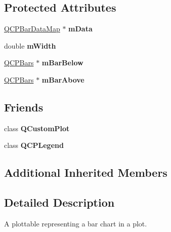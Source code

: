 \subsection*{Protected Attributes}
\begin{DoxyCompactItemize}
\item 
\hypertarget{classQCPBars_aef28d29d51ef84b608ecd22c55d531ff}{\hyperlink{qcustomplot_8h_aa846c77472cae93def9f1609d0c57191}{Q\-C\-P\-Bar\-Data\-Map} $\ast$ {\bfseries m\-Data}}\label{classQCPBars_aef28d29d51ef84b608ecd22c55d531ff}

\item 
\hypertarget{classQCPBars_a7c4e0f2246f8133f48a9c3f24cf5b920}{double {\bfseries m\-Width}}\label{classQCPBars_a7c4e0f2246f8133f48a9c3f24cf5b920}

\item 
\hypertarget{classQCPBars_a02eb7de7a2c03dc5699f329bb1c5f6e1}{\hyperlink{classQCPBars}{Q\-C\-P\-Bars} $\ast$ {\bfseries m\-Bar\-Below}}\label{classQCPBars_a02eb7de7a2c03dc5699f329bb1c5f6e1}

\item 
\hypertarget{classQCPBars_ade19776a2a6d393f15c0e27d4bb8e594}{\hyperlink{classQCPBars}{Q\-C\-P\-Bars} $\ast$ {\bfseries m\-Bar\-Above}}\label{classQCPBars_ade19776a2a6d393f15c0e27d4bb8e594}

\end{DoxyCompactItemize}
\subsection*{Friends}
\begin{DoxyCompactItemize}
\item 
\hypertarget{classQCPBars_a1cdf9df76adcfae45261690aa0ca2198}{class {\bfseries Q\-Custom\-Plot}}\label{classQCPBars_a1cdf9df76adcfae45261690aa0ca2198}

\item 
\hypertarget{classQCPBars_a8429035e7adfbd7f05805a6530ad5e3b}{class {\bfseries Q\-C\-P\-Legend}}\label{classQCPBars_a8429035e7adfbd7f05805a6530ad5e3b}

\end{DoxyCompactItemize}
\subsection*{Additional Inherited Members}


\subsection{Detailed Description}
A plottable representing a bar chart in a plot. 

